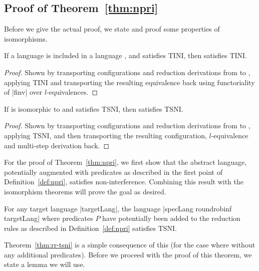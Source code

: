 \subsection{Proof of Theorem~\ref{thm:npri}}
\label{sec:proofs}

Before we give the actual proof, we state and proof some properties
of isomorphisms.

\begin{theorem}
  If a language  is included in a language , and 
  satisfies TINI, then  satisfies TINI.
\end{theorem}

\begin{proof}
  Shown by transporting configurations and reduction derivations
  from  to , applying TINI and transporting the resulting
  equivalence back using functoriality of |finv| over $l$-equivalences.
\end{proof}

\begin{theorem}
  If  is isomorphic to  and  satisfies TSNI, then
   satisfies TSNI.
\end{theorem}

\begin{proof}
  Shown by transporting configurations and reduction derivations from
   to , applying TSNI, and then transporting the
  resulting configuration, $l$-equivalence and multi-step derivation back.
\end{proof}

For the proof of Theorem~\ref{thm:npri}, we first show that the
abstract language, potentially augmented with predicates as described
in the first point of Definition~\ref{def:npri}, satisfies
non-interference.  Combining this result with the isomorphism theorems
will prove the goal as desired.

\begin{theorem}
  \label{thm:rr-tsni-general}
  For any target language |targetLang|,
  the language |specLang roundrobinf targetLang| where predicates $P$
  have potentially been added to the reduction rules as described in
  Definition~\ref{def:npri} satisfies TSNI.
\end{theorem}

Theorem~\ref{thm:rr-tsni} is a simple consequence of this
(for the case where without any additional predicates).
Before we proceed with the proof of this theorem, we state a
lemma we will use.

